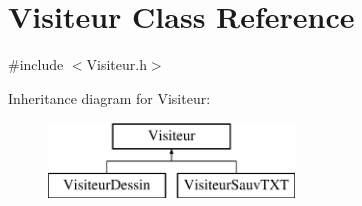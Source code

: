 \hypertarget{class_visiteur}{}\section{Visiteur Class Reference}
\label{class_visiteur}


{\ttfamily \#include $<$Visiteur.\+h$>$}

Inheritance diagram for Visiteur\+:\begin{figure}[H]
\begin{center}
\leavevmode
\includegraphics[height=2.000000cm]{class_visiteur}
\end{center}
\end{figure}

